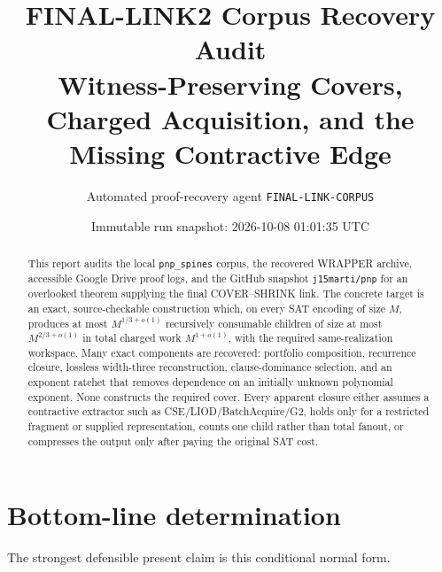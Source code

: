 \documentclass[11pt]{article}
\title{FINAL-LINK2 Corpus Recovery Audit\\
\large Witness-Preserving Covers, Charged Acquisition, and the Missing Contractive Edge}
\author{Automated proof-recovery agent \texttt{FINAL-LINK-CORPUS}}
\date{Immutable run snapshot: 2026-10-08 01:01:35 UTC}
\begin{document}
\maketitle

\begin{abstract}
This report audits the local \texttt{pnp\_spines} corpus, the recovered WRAPPER archive, accessible Google Drive proof logs, and the GitHub snapshot \texttt{j15marti/pnp} for an overlooked theorem supplying the final COVER--SHRINK link.  The concrete target is an exact, source-checkable construction which, on every SAT encoding of size $M$, produces at most $M^{1/3+o(1)}$ recursively consumable children of size at most $M^{2/3+o(1)}$ in total charged work $M^{1+o(1)}$, with the required same-realization workspace.  Many exact components are recovered: portfolio composition, recurrence closure, lossless width-three reconstruction, clause-dominance selection, and an exponent ratchet that removes dependence on an initially unknown polynomial exponent.  None constructs the required cover.  Every apparent closure either assumes a contractive extractor such as CSE/LIOD/BatchAcquire/G2, holds only for a restricted fragment or supplied representation, counts one child rather than total fanout, or compresses the output only after paying the original SAT cost.
\end{abstract}

\section{Bottom-line determination}

\begin{center}
\end{center}

The strongest defensible present claim is this conditional normal form.
\end{document}
